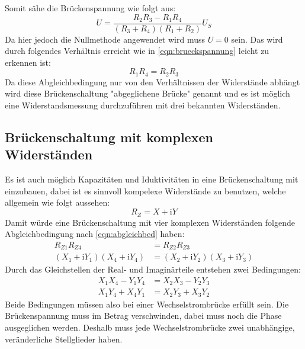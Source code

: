\documentclass[titlepage = firstcover]{scrartcl}
\begin{document}
          Somit sähe die Brückenspannung wie folgt aus:
          \begin{equation}
            \label{eqn:brueckspannung}
            U = \frac{R_2 R_3 - R_1 R_4}{(R_3 + R_4) (R_1 + R_2)}U_S
          \end{equation}
          Da hier jedoch die Nullmethode angewendet wird muss $U = 0$ sein. Das wird durch folgendes Verhältnis erreicht wie in \eqref{eqn:brueckspannung}
          leicht zu erkennen ist:
          \begin{equation}
            \label{eqn:abgleichbed}
            R_1 R_4 = R_2 R_3
          \end{equation}
          Da diese Abgleichbedingung nur von den Verhältnissen der Widerstände abhängt wird diese Brückenschaltung "abgeglichene Brücke" genannt und es ist
          möglich eine Widerstandsmessung durchzuführen mit drei bekannten Widerständen.

        \subsection{Brückenschaltung mit komplexen Widerständen}
          Es ist auch möglich Kapazitäten und Iduktivitäten in eine Brückenschaltung mit einzubauen, dabei ist es sinnvoll kompelexe Widerstände zu benutzen,
          welche allgemein wie folgt aussehen:
          \begin{equation}
            \label{eqn:komplexwiderstand}
            R_Z = X + \text{i} Y
          \end{equation}
          Damit würde eine Brückenschaltung mit vier komplexen Widerständen folgende Abgleichbedingung nach \eqref{eqn:abgleichbed} haben:
          \begin{align}
            R_{Z1} R_{Z4} &= R_{Z2} R_{Z3} \\
            (X_1 + \text{i} Y_1)(X_4 + \text{i} Y_4) &= (X_2 + \text{i} Y_2)(X_3 + \text{i} Y_3)
          \end{align}
          Durch das Gleichstellen der Real- und Imaginärteile entstehen zwei Bedingungen:
          \begin{align}
            \label{eqn:komplexabgleich1}
            X_1 X_4 - Y_1 Y_4 &= X_2 X_3 - Y_2 Y_3 \\
            \label{eqn:komplexabgleich2}
            X_1 Y_4 + X_4 Y_1 &= X_2 Y_3 + X_3 Y_2
          \end{align}
          Beide Bedingungen müssen also bei einer Wechselstrombrücke erfüllt sein. Die Brückenspannung muss im Betrag verschwinden, dabei muss noch die Phase
          ausgeglichen werden. Deshalb muss jede Wechselstrombrücke zwei unabhängige, veränderliche Stellglieder haben.
\end{document}
